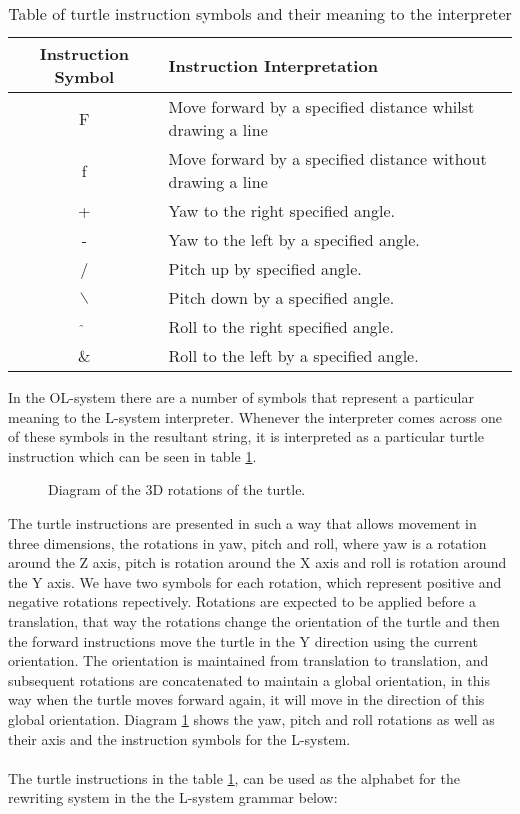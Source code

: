\begin{table}[h!]
\centering
\begin{tabular}{ | c | l | }
\hline
	Instruction Symbol 	& Instruction Interpretation \\  
\hline
\hline
	F 					& Move forward by a specified distance whilst drawing a line\\
\hline
	f 					& Move forward by a specified distance without drawing a line\\
\hline
	+ 					& Yaw to the right specified angle.\\
\hline
	- 					& Yaw to the left by a specified angle.\\
\hline
	/ 					& Pitch up by specified angle. \\
\hline
	$\backslash$ 		& Pitch down by a specified angle.\\
\hline
	$\hat{}$ 			& Roll to the right specified angle.\\
\hline
	\& 					& Roll to the left by a specified angle.\\
\hline
\end{tabular}
\caption{Table of turtle instruction symbols and their meaning to the interpreter}
\label{instruction table 1}
\end{table}
\FloatBarrier

\noindent
In the OL-system there are a number of symbols that represent a particular meaning to the L-system interpreter. Whenever the interpreter comes across one of these symbols in the resultant string, it is interpreted as a particular turtle instruction which can be seen in table \ref{instruction table 1}. 

\begin{figure}[htbp]
	{\centering
		\setlength{\fboxrule}{1pt}
		\vspace{7px}
		\caption{Diagram of the 3D rotations of the turtle.} \label{3D rotations}
	}
\end{figure}
\FloatBarrier

\noindent
The turtle instructions are presented in such a way that allows movement in three dimensions, the rotations in yaw, pitch and roll, where yaw is a rotation around the Z axis, pitch is rotation around the X axis and roll is rotation around the Y axis. We have two symbols for each rotation, which represent positive and negative rotations repectively. Rotations are expected to be applied before a translation, that way the rotations change the orientation of the turtle and then the forward instructions move the turtle in the Y direction using the current orientation. The orientation is maintained from translation to translation, and subsequent rotations are concatenated to maintain a global orientation, in this way when the turtle moves forward again, it will move in the direction of this global orientation. Diagram  \ref{3D rotations} shows the yaw, pitch and roll rotations as well as their axis and the instruction symbols for the L-system.\\
\\
The turtle instructions in the table \ref{instruction table 1}, can be used as the alphabet for the rewriting system in the the L-system grammar below:

